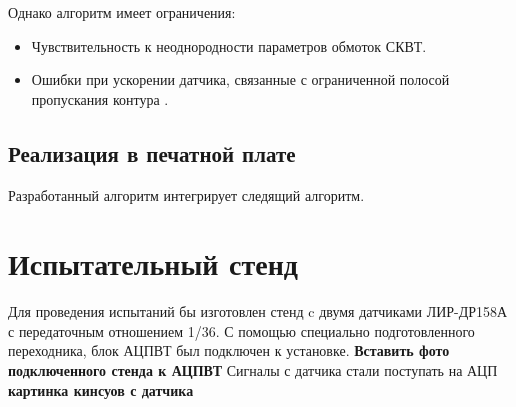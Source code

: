 Однако алгоритм имеет ограничения:
\begin{itemize}
    \item Чувствительность к неоднородности параметров обмоток СКВТ.
    \item Ошибки при ускорении датчика, связанные с ограниченной полосой пропускания контура \cite{Anufriev2014}.
\end{itemize}

\subsection{Реализация в печатной плате}
Разработанный алгоритм интегрирует следящий алгоритм.

\section{Испытательный стенд}

Для проведения испытаний бы изготовлен стенд c двумя датчиками ЛИР-ДР158А с передаточным отношением 1/36. 
С помощью специально подготовленного переходника, блок АЦПВТ был подключен к установке. \textbf{Вставить фото подключенного стенда к АЦПВТ}
Сигналы с датчика стали поступать на АЦП \textbf{картинка кинсуов с датчика}